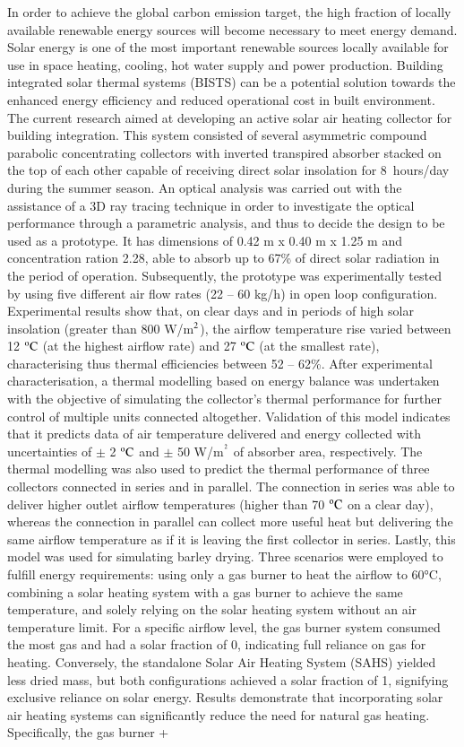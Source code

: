 In order to achieve the global carbon emission target, the high fraction of locally available renewable energy sources will become necessary to meet energy demand. Solar energy is one of the most important renewable sources locally available for use in space heating, cooling, hot water supply and power production. Building integrated solar thermal systems (BISTS) can be a potential solution towards the enhanced energy efficiency and reduced operational cost in built environment. The current research aimed at developing an active solar air heating collector for building integration. This system consisted of several asymmetric compound parabolic concentrating collectors with inverted transpired absorber stacked on the top of each other capable of receiving direct solar insolation for 8~hours/day during the summer season. An optical analysis was carried out with the assistance of a 3D ray tracing technique in order to investigate the optical performance through a parametric analysis, and thus to decide the design to be used as a prototype. It has dimensions of 0.42 m x 0.40 m x 1.25 m and concentration ration 2.28, able to absorb up to 67\% of direct solar radiation in the period of operation. Subsequently, the prototype was experimentally tested by using five different air flow rates (22 -- 60 kg/h) in open loop configuration. Experimental results show that, on clear days and in periods of high solar insolation (greater than 800 W/m$^{\rm{2}}$), the airflow temperature rise varied between 12 $\rm{^oC}$ (at the highest airflow rate) and 27 $\rm{^oC}$ (at the smallest rate), characterising thus thermal efficiencies between 52 -- 62\%. After experimental characterisation, a thermal modelling based on energy balance was undertaken with the objective of simulating the collector’s thermal performance for further control of multiple units connected altogether. Validation of this model indicates that it predicts data of air temperature delivered and energy collected with uncertainties of $\pm$ 2 $\rm{^oC}$ and $\pm$ 50 W/m$^{\rm{^2}}$ of absorber area, respectively. The thermal modelling was also used to predict the thermal performance of three collectors connected in series and in parallel. The connection in series was able to deliver higher outlet airflow temperatures (higher than 70 $\rm{^oC}$ on a clear day), whereas the connection in parallel can collect more useful heat but delivering the same airflow temperature as if it is leaving the first collector in series. Lastly, this model was used for simulating barley drying. Three scenarios were employed to fulfill energy requirements: using only a gas burner to heat the airflow to 60°C, combining a solar heating system with a gas burner to achieve the same temperature, and solely relying on the solar heating system without an air temperature limit. For a specific airflow level, the gas burner system consumed the most gas and had a solar fraction of 0, indicating full reliance on gas for heating. Conversely, the standalone Solar Air Heating System (SAHS) yielded less dried mass, but both configurations achieved a solar fraction of 1, signifying exclusive reliance on solar energy. Results demonstrate that incorporating solar air heating systems can significantly reduce the need for natural gas heating. Specifically, the gas burner + 